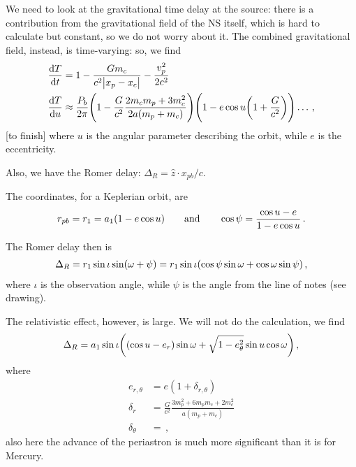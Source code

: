 \documentclass[main.tex]{subfiles}
\begin{document}
We need to look at the gravitational time delay at the source: there is a contribution from the gravitational field of the NS itself, which is hard to calculate but constant, so we do not worry about it. 
The combined gravitational field, instead, is time-varying: so, we find 
%
\begin{subequations}
\begin{align}
\dv{T}{t} &= 1 - \frac{G m_c}{c^2 \abs{x_p - x_c}} - \frac{v_p^2}{2 c^2}  \\
 \dv{T}{u} &\approx \frac{P_b}{2 \pi } \qty(1 - \frac{G}{c^2} \frac{2 m_c m_p + 3 m_c^2}{2 a (m_p + m_c)})\qty(1 - e \cos u \qty(1 + \frac{G}{c^2})) \dots
\,,
\end{align}
\end{subequations}
%
[to finish]
where \(u\) is the angular parameter describing the orbit, while \(e\) is the eccentricity.

Also, we have the Romer delay: \(\Delta_{R} = \hat{z} \cdot x_{pb} / c\). 

The coordinates, for a Keplerian orbit, are 
%
\begin{align}
r_{pb} = r_1 = a_1 \qty(1 - e \cos u )
\qquad \text{and} \qquad
\cos \psi = \frac{\cos u - e}{1- e \cos u}
\,.
\end{align}

The Romer delay then is 
%
\begin{align}
\Delta_{R} = r_1 \sin \iota \sin(\omega+\psi ) 
= r_1 \sin \iota \qty(\cos \psi \sin \omega + \cos \omega \sin \psi )
\,,
\end{align}
%
where \(\iota \) is the observation angle, while \(\psi \) is the angle from the line of notes (see drawing). 

The relativistic effect, however, is large. 
We will not do the calculation, we find 
%
\begin{align}
\Delta_{R} = a_1 \sin \iota 
\qty((\cos u - e_r ) \sin \omega + \sqrt{1 - e^2_{\theta }} \sin u \cos \omega )
\,, 
\end{align}
%
where 
%
\begin{subequations}
\begin{align}
e_{r, \theta } &= e (1 + \delta_{r, \theta })  \\
\delta_{r} &= \frac{G}{c^2} \frac{3 m_p^2 + 6 m_p m_c + 2 m_c^2}{a (m_p + m_c)}  \\
\delta_{\theta } &= 
\,,
\end{align}
\end{subequations}
%
also here the advance of the periastron is much more significant than it is for Mercury. 
\end{document}
